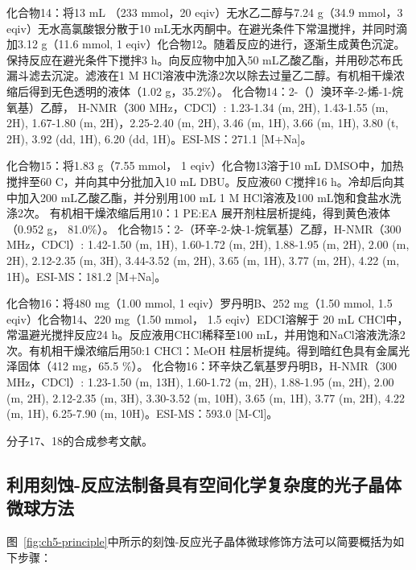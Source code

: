 化合物14：将13 mL （233 mmol，20 eqiv）无水乙二醇与7.24 g（34.9 mmol，3 eqiv）无水高氯酸银分散于10 mL无水丙酮中。在避光条件下常温搅拌，并同时滴加3.12 g（11.6 mmol, 1 eqiv）化合物12。随着反应的进行，逐渐生成黄色沉淀。保持反应在避光条件下搅拌3 h。向反应物中加入50 mL乙酸乙酯，并用砂芯布氏漏斗滤去沉淀。滤液在1 M HCl溶液中洗涤2次以除去过量乙二醇。有机相干燥浓缩后得到无色透明的液体（1.02 g，35.2\%）。
化合物14：2-（）溴环辛-2-烯-1-烷氧基）乙醇， H-NMR（300 MHz，CDCl）: \text{$\delta$} 1.23-1.34 (m, 2H), 1.43-1.55 (m, 2H), 1.67-1.80 (m, 2H)，2.25-2.40 (m, 2H), 3.46 (m, 1H), 3.66 (m, 1H), 3.80 (t, 2H), 3.92 (dd, 1H), 6.20 (dd, 1H)。ESI-MS：271.1 [M+Na]\text{$^+$}。

化合物15：将1.83 g（7.55 mmol， 1 eqiv）化合物13溶于10 mL DMSO中，加热搅拌至60 \text{$^\circ$}C，并向其中分批加入10 mL DBU。反应液60 \text{$^\circ$}C搅拌16 h。冷却后向其中加入200 mL乙酸乙酯，并分别用100 mL 1 M HCl溶液及100 mL饱和食盐水洗涤2次。 有机相干燥浓缩后用10：1 PE:EA 展开剂柱层析提纯，得到黄色液体（0.952 g， 81.0\%）。
化合物15：2-（环辛-2-炔-1-烷氧基）乙醇，H-NMR（300 MHz，CDCl）: \text{$\delta$} 1.42-1.50 (m, 1H), 1.60-1.72 (m, 2H), 1.88-1.95 (m, 2H), 2.00 (m, 2H), 2.12-2.35 (m, 3H), 3.44-3.52 (m, 2H), 3.65 (m, 1H), 3.77 (m, 2H), 4.22 (m, 1H)。ESI-MS：181.2 [M+Na]\text{$^+$}。

化合物16：将480 mg（1.00 mmol, 1 eqiv）罗丹明B、252 mg（1.50 mmol, 1.5 eqiv）化合物14、220 mg（1.50 mmol， 1.5 eqiv）EDCI溶解于 20 mL CHCl中，常温避光搅拌反应24 h。反应液用CHCl稀释至100 mL，并用饱和NaCl溶液洗涤2次。有机相干燥浓缩后用50:1 CHCl：MeOH 柱层析提纯。得到暗红色具有金属光泽固体（412 mg，65.5 \%）。
化合物16：环辛炔乙氧基罗丹明B，H-NMR（300 MHz，CDCl）: \text{$\delta$} 1.23-1.50 (m, 13H), 1.60-1.72 (m, 2H), 1.88-1.95 (m, 2H), 2.00 (m, 2H), 2.12-2.35 (m, 3H), 3.30-3.52 (m, 10H), 3.65 (m, 1H), 3.77 (m, 2H), 4.22 (m, 1H), 6.25-7.90 (m, 10H)。ESI-MS：593.0 [M-Cl]\text{$^+$}。

分子17、18的合成参考文献。

\subsection{利用刻蚀-反应法制备具有空间化学复杂度的光子晶体微球方法}


图~\ref{fig:ch5-principle}中所示的刻蚀-反应光子晶体微球修饰方法可以简要概括为如下步骤：

